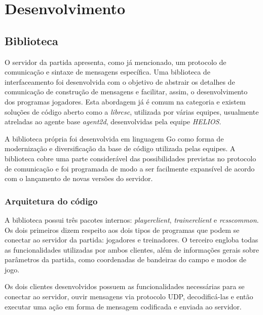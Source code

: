 \chapter{Desenvolvimento \label{chap:Desenvolvimento}}



\section{Biblioteca} \label{sec:lib}

O servidor da partida apresenta, como já mencionado, um protocolo de comunicação e sintaxe de mensagens específica. Uma biblioteca de interfaceamento foi desenvolvida com o objetivo de abstrair os detalhes de comunicação de construção de mensagens e facilitar, assim, o desenvolvimento dos programas jogadores. Esta abordagem já é comum na categoria e existem soluções de código aberto como a \textit{librcsc}, utilizada por várias equipes, usualmente atreladas ao agente base \textit{agent2d}, desenvolvidas pela equipe \textit{HELIOS}.

A biblioteca própria foi desenvolvida em linguagem Go como forma de modernização e diversificação da base de código utilizada pelas equipes. A biblioteca cobre uma parte considerável das possibilidades previstas no protocolo de comunicação e foi programada de modo a ser facilmente expansível de acordo com o lançamento de novas versões do servidor.

\subsection{Arquitetura do código}
A biblioteca possui três pacotes internos: \textit{playerclient}, \textit{trainerclient} e \textit{rcsscommon}. Os dois primeiros dizem respeito aos dois tipos de programas que podem se conectar ao servidor da partida: jogadores e treinadores. O terceiro engloba todas as funcionalidades utilizadas por ambos clientes, além de informações gerais sobre parâmetros da partida, como coordenadas de bandeiras do campo e modos de jogo.

Os dois clientes desenvolvidos possuem as funcionalidades necessárias para se conectar ao servidor, ouvir mensagens via protocolo UDP, decodificá-las e então executar uma ação em forma de mensagem codificada e enviada ao servidor.

